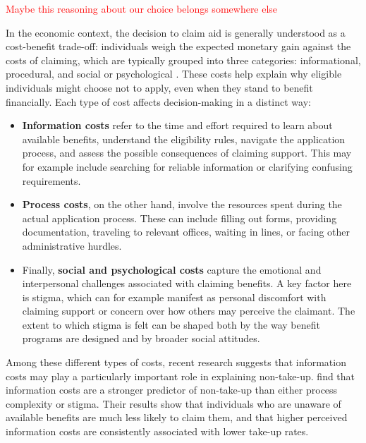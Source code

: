 \textcolor{red}{Maybe this reasoning about our choice belongs somewhere else}

In the economic context, the decision to claim aid is generally understood as a cost-benefit trade-off: individuals weigh the expected monetary gain against the costs of claiming, which are typically grouped into three categories: informational, procedural, and social or psychological \citep{booij_role_2012}. 
These costs help explain why eligible individuals might choose not to apply, even when they stand to benefit financially. 
Each type of cost affects decision-making in a distinct way:

\begin{itemize}
  \item \textbf{Information costs} refer to the time and effort required to learn about available benefits, understand the eligibility rules, navigate the application process, and assess the possible consequences of claiming support. This may for example include searching for reliable information or clarifying confusing requirements.
  \item \textbf{Process costs}, on the other hand, involve the resources spent during the actual application process. These can include filling out forms, providing documentation, traveling to relevant offices, waiting in lines, or facing other administrative hurdles.
  \item Finally, \textbf{social and psychological costs} capture the emotional and interpersonal challenges associated with claiming benefits. A key factor here is stigma, which can for example manifest as personal discomfort with claiming support or concern over how others may perceive the claimant. The extent to which stigma is felt can be shaped both by the way benefit programs are designed and by broader social attitudes.
\end{itemize}

Among these different types of costs, recent research suggests that information costs may play a particularly important role in explaining non-take-up. \cite{bolland_information_nodate} find that information costs are a stronger predictor of non-take-up than either process complexity or stigma. Their results show that individuals who are unaware of available benefits are much less likely to claim them, and that higher perceived information costs are consistently associated with lower take-up rates. 


